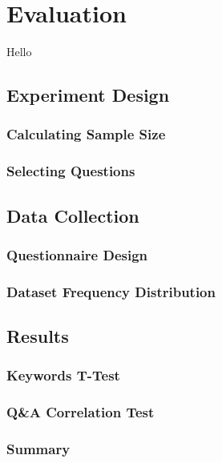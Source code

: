 

\chapter{Evaluation} \label{Chapter:Evaluation}
Hello

\section{Experiment Design}
\subsection{Calculating Sample Size}
\subsection{Selecting Questions}

\section{Data Collection}
\subsection{Questionnaire Design}
\subsection{Dataset Frequency Distribution}

\section{Results}
\subsection{Keywords T-Test}
\subsection{Q\&A Correlation Test}
\subsection{Summary}